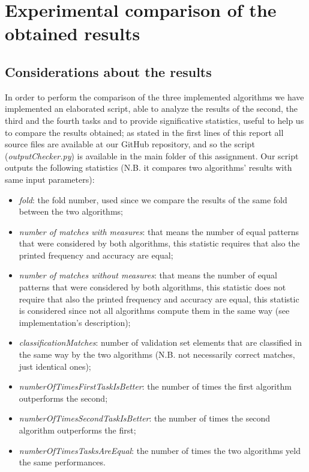 \documentclass[11pt, a4paper]{article}
\begin{document}
	\section{Experimental comparison of the obtained results}
		\subsection{Considerations about the results}
		In order to perform the comparison of the three implemented algorithms we have implemented an elaborated script, able to analyze the results of the second, the third and the fourth tasks and to provide significative statistics, useful to help us to compare the results obtained; as stated in the first lines of this report all source files are available at our GitHub repository, and so the script (\textit{outputChecker.py}) is available in the main folder of this assignment. \newline
		Our script outputs the following statistics (N.B. it compares two algorithms' results with same input parameters):
		\begin{itemize}
			\item \textit{fold}: the fold number, used since we compare the results of the same fold between the two algorithms;
			\item \textit{number of matches with measures}: that means the number of equal patterns that were considered by both algorithms, this statistic requires that also the printed frequency and accuracy are equal;
			\item \textit{number of matches without measures}: that means the number of equal patterns that were considered by both algorithms, this statistic does not require that also the printed frequency and accuracy are equal, this statistic is considered since not all algorithms compute them in the same way (see implementation's description);
			\item \textit{classificationMatches}: number of validation set elements that are classified in the same way by the two algorithms (N.B. not necessarily correct matches, just identical ones);
			\item \textit{numberOfTimesFirstTaskIsBetter}: the number of times the first algorithm outperforms the second;
			\item \textit{numberOfTimesSecondTaskIsBetter}: the number of times the second algorithm outperforms the first;
			\item \textit{numberOfTimesTasksAreEqual}: the number of times the two algorithms yeld the same performances.
		\end{itemize}
\end{document}
